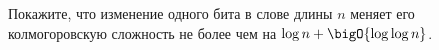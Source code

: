 Покажите, что изменение одного бита в слове длины $n$ меняет его колмогоровскую сложность не более чем на
$\log n + \bigO{\log \log n}$.
